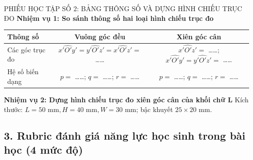 \documentclass[12pt, a4paper]{article}
\begin{document}
\begin{itemize}[leftmargin=1.2cm]
\begin{pedabox}{PHIẾU HỌC TẬP SỐ 2: BẢNG THÔNG SỐ VÀ DỰNG HÌNH CHIẾU TRỤC ĐO}
    \textbf{Nhiệm vụ 1: So sánh thông số hai loại hình chiếu trục đo}
    \begin{center}
    \begin{tabular}{|l|c|c|}
    \hline
    \textbf{Thông số} & \textbf{Vuông góc đều} & \textbf{Xiên góc cân} \\ \hline
    Các góc trục đo & $\widehat{x'O'y'} = \widehat{y'O'z'} = \widehat{x'O'z'} =$ \dots\dots & $\widehat{x'O'z'} =$ \dots\dots; $\widehat{x'O'y'} = \widehat{y'O'z'} =$ \dots\dots \\ \hline
    Hệ số biến dạng & $p = $ \dots\dots; $q = $ \dots\dots; $r = $ \dots\dots & $p = $ \dots\dots; $q = $ \dots\dots; $r = $ \dots\dots \\ \hline
    \end{tabular}
    \end{center}

    \textbf{Nhiệm vụ 2: Dựng hình chiếu trục đo xiên góc cân của khối chữ L}
    Kích thước: $L=50\text{ mm}, H=40\text{ mm}, W=30\text{ mm}$; bậc khuyết $25 \times 20\text{ mm}$.
    \vspace{4.5cm}
\end{pedabox}

\subsection*{3. Rubric đánh giá năng lực học sinh trong bài học (4 mức độ)}


\end{itemize}
\end{document}

